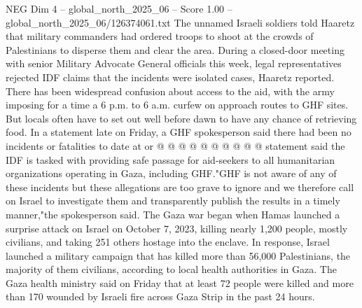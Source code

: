 \begin{textsample}{NEG Dim 4 – global\_north\_2025\_06 – Score 1.00 – global\_north\_2025\_06/126374061.txt}
The unnamed Israeli soldiers told Haaretz that military commanders had ordered troops to shoot at the crowds of Palestinians to disperse them and clear the area.
During a closed-door meeting with senior Military Advocate General officials this week, legal representatives rejected IDF claims that the incidents were isolated cases, Haaretz reported.
There has been widespread confusion about access to the aid, with the army imposing for a time a 6 p.m. to 6 a.m. curfew on approach routes to GHF sites.
But locals often have to set out well before dawn to have any chance of retrieving food.
In a statement late on Friday, a GHF spokesperson said there had been no incidents or fatalities to date at or @ @ @ @ @ @ @ @ @ @ statement said the IDF is tasked with providing safe passage for aid-seekers to all humanitarian organizations operating in Gaza, including GHF."GHF is not aware of any of these incidents but these allegations are too grave to ignore and we therefore call on Israel to investigate them and transparently publish the results in a timely manner,"the spokesperson said.
The Gaza war began when Hamas launched a surprise attack on Israel on October 7, 2023, killing nearly 1,200 people, mostly civilians, and taking 251 others hostage into the enclave.
In response, Israel launched a military campaign that has killed more than 56,000 Palestinians, the majority of them civilians, according to local health authorities in Gaza.
The Gaza health ministry said on Friday that at least 72 people were killed and more than 170 wounded by Israeli fire across Gaza Strip in the past 24 hours.

\end{textsample}
